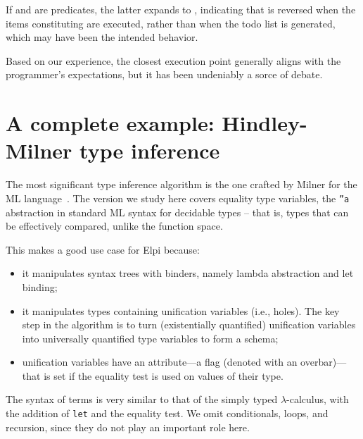 \documentclass[a4paper, 11pt]{book}
\begin{document}
If  and  are predicates, the latter expands to
, indicating that  is reversed when
the items constituting  are executed, rather than when
the todo list is generated, which may have been the intended behavior.

Based on our experience, the closest execution point generally aligns with
the programmer's expectations, but it has been undeniably a sorce of debate.

\section{A complete example: Hindley-Milner type inference}\label{sec:milner}


The most significant type inference algorithm is the one crafted by Milner
for the ML language~\cite{MILNER1978348}. The version we study here covers
equality type variables, the \texttt{''a} abstraction in standard ML syntax
for decidable types -- that is, types that can be effectively compared, unlike
the function space.

This makes a good use case for Elpi because:
\begin{itemize}
  \item it manipulates syntax trees with binders, namely lambda abstraction
    and let binding;
  \item it manipulates types containing unification variables (i.e., holes).
    The key step in the algorithm is to turn (existentially quantified)
    unification variables into universally quantified type variables to form a
    schema;
  \item unification variables have an attribute—a flag (denoted with an
    overbar)—that is set if the equality test is used on values of their type.
\end{itemize}

The syntax of terms is very similar to that of the simply typed
$\lambda$-calculus, with the addition of \texttt{let} and the equality test.
We omit conditionals, loops, and recursion, since they do not play an
important role here.
\end{document}
